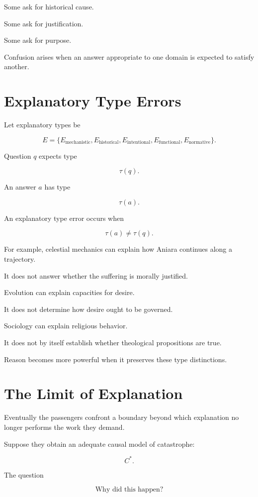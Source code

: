 \documentclass[11pt,oneside]{book}
\theoremstyle{definition}
\theoremstyle{remark}
\begin{document}
Some ask for historical cause.

Some ask for justification.

Some ask for purpose.

Confusion arises when an answer appropriate to one domain is expected to satisfy another.

\section{Explanatory Type Errors}

Let explanatory types be

\[
E
=
\{
E_{\mathrm{mechanistic}},
E_{\mathrm{historical}},
E_{\mathrm{intentional}},
E_{\mathrm{functional}},
E_{\mathrm{normative}}
\}.
\]

Question \(q\) expects type

\[
\tau(q).
\]

An answer \(a\) has type

\[
\tau(a).
\]

An explanatory type error occurs when

\[
\tau(a)\neq\tau(q).
\]

For example, celestial mechanics can explain how Aniara continues along a trajectory.

It does not answer whether the suffering is morally justified.

Evolution can explain capacities for desire.

It does not determine how desire ought to be governed.

Sociology can explain religious behavior.

It does not by itself establish whether theological propositions are true.

Reason becomes more powerful when it preserves these type distinctions.

\section{The Limit of Explanation}

Eventually the passengers confront a boundary beyond which explanation no longer performs the work they demand.

Suppose they obtain an adequate causal model of catastrophe:

\[
C^\ast.
\]

The question

\[
\text{Why did this happen?}
\]
\end{document}
